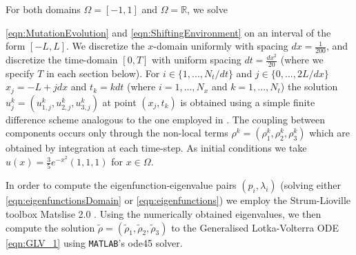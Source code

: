 \documentclass{article}
\begin{document}
For both domains $\Omega=[-1,1]$ and $\Omega=\mathbb{R}$, we solve {\eqref{eqn:MutationEvolution} and \eqref{eqn:ShiftingEnvironment} on an interval of the form $[-L,L]$. We discretize the $x$-domain uniformly with spacing $dx=\frac{1}{200}$, and discretize the time-domain $[0,T]$ with uniform spacing $dt=\frac{dx^2}{20}$ (where we specify $T$ in each section below). For $i\in{}\{1,...,N_t/dt\}$ and $j\in\{0,...,2L/dx\}$ $x_j=-L+jdx{}$ and $t_k=kdt$ (where $i=1,...,N_x$ and $k=1,...,N_t$)  the solution $u^{k}_j=(u_{1,j}^k,u_{2,j}^k,u_{3,j}^k)$ at point $(x_j,t_k)$  is obtained using a simple finite difference scheme analogous to the one employed in \cite{adaptivedynamicsdivergingfitness}.  The coupling between components occurs only through the non-local terms $\rho^k=(\rho_1^k,\rho_2^k,\rho_3^k)$ which are obtained by integration at each time-step. As initial conditions we take $u(x)=\frac{3}{5}e^{-x^2}(1,1,1)$ for $x\in\Omega$.

In order to compute the eigenfunction-eigenvalue pairs $(p_i,\lambda_i)$ (solving either \eqref{eqn:eigenfunctionsDomain} or \eqref{eqn:eigenfunctions}) we  employ the Strum-Lioville toolbox Matslise 2.0 \cite{ledoux2016matslise}. Using the numerically obtained eigenvalues, we then compute the solution  $\tilde{\rho}=(\tilde{\rho}_1,\tilde{\rho}_2,\tilde{\rho}_3)$ to the Generalised Lotka-Volterra ODE \eqref{eqn:GLV_1}  using \texttt{MATLAB}'s ode45 solver.


}
\end{document}
